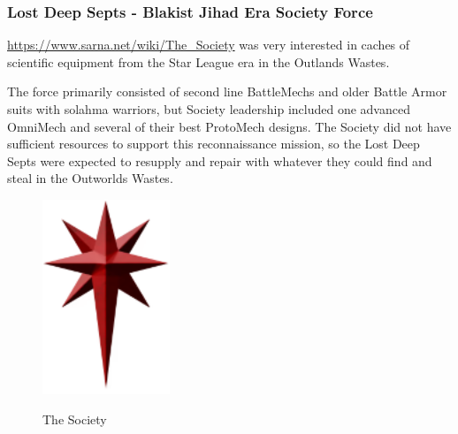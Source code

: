 \subsubsection{Lost Deep Septs - Blakist Jihad Era Society Force}

\href{The Society}{https://www.sarna.net/wiki/The_Society} was very interested in caches of scientific equipment from the Star League era in the Outlands Wastes.

The force primarily consisted of second line BattleMechs and older Battle Armor suits with solahma warriors, but Society leadership included one advanced OmniMech and several of their best ProtoMech designs.
The Society did not have sufficient resources to support this reconnaissance mission, so the Lost Deep Septs were expected to resupply and repair with whatever they could find and steal in the Outworlds Wastes.

\begin{figure}[!h]
  \centering
  \includegraphics[alt='Society Logo', width=1.5in, height=2.292in]{img/Society.png}
  \caption*{The Society}
\end{figure}

